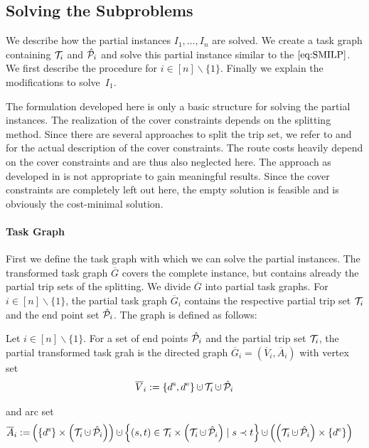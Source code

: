 \subsection{Solving the Subproblems}
\label{sec:heuristic_solving_subproblems}

We describe how the partial instances ${I_1,\dots,I_n}$ are solved. We create a task graph containing $\mathcal{T}_i$ and $\hat{\mathcal{P}}_i$ and solve this partial instance similar to the $\eqref{eq:SMILP}$. We first describe the procedure for ${i\in[n]\backslash\{1\}}$. Finally we explain the modifications to solve~$I_1$.

\begin{remark}

The formulation developed here is only a basic structure for solving the partial instances. The realization of the cover constraints depends on the splitting method. Since there are several approaches to split the trip set, we refer to  and  for the actual description of the cover constraints. The route costs heavily depend on the cover constraints and are thus also neglected here. The approach as developed in  is not appropriate to gain meaningful results. Since the cover constraints are completely left out here, the empty solution is feasible and is obviously the cost-minimal solution.

\end{remark}

\paragraph{Task Graph} \parfill

First we define the task graph with which we can solve the partial instances. The transformed task graph $\overline{G}$ covers the complete instance, but contains already the partial trip sets of the splitting. We divide $\overline{G}$ into partial task graphs. For ${i\in[n]\backslash\{1\}}$, the partial task graph $\overline{G}_i$ contains the respective partial trip set $\mathcal{T}_i$ and the end point set $\hat{\mathcal{P}}_i$. The graph is defined as follows:

\begin{definition}

Let ${i\in[n]\backslash\{1\}}$. For a set of end points $\hat{\mathcal{P}}_i$ and the partial trip set $\mathcal{T}_i$, the partial transformed task grah is the directed graph ${\overline{G}_i=\left(\overline{V}_i,\overline{A}_i\right)}$ with vertex set
\begin{align*}
	\overline{V}_i := \left\{\ds,\de\right\}\cupdot\Ti\cupdot\Phat_i
\end{align*}

and arc set
\begin{align*}
	\overline{A}_i := & \left(\left\{\ds\right\}\times\left(\Ti\cupdot\Phat_i\right)\right)\cupdot\left\{(s,t)\in\Ti\times\left(\Ti\cupdot\Phat_i\right)\mid s\prec t\right\} \cupdot\left(\left(\Ti\cupdot\Phat_i\right)\times\left\{\de\right\}\right)
\end{align*}

\end{definition}

